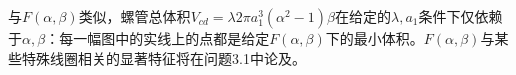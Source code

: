 与$F(\alpha,\beta)$类似，螺管总体积$V_{cd}=\lambda 2\pi a_1^3(\alpha^2-1)\beta$在给定的$\lambda,a_1$条件下仅依赖于$\alpha,\beta$：每一幅图中的实线上的点都是给定$F(\alpha,\beta)$下的最小体积。$F(\alpha,\beta)$与某些特殊线圈相关的显著特征将在问题3.1中论及。

\begin{figure}[htbp]
	\centering


\end{figure}

